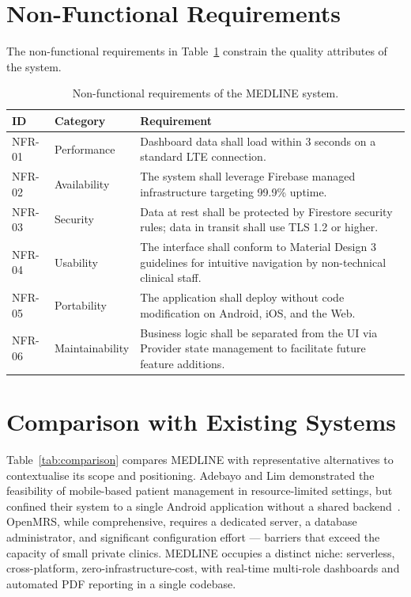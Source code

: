 \documentclass[12pt,a4paper,oneside]{report}
\newcommand{\source}[1]{\par\vspace{2pt}{\small\itshape Source: #1}\par}
\begin{document}
\section{Non-Functional Requirements}

The non-functional requirements in Table~\ref{tab:nfr} constrain the quality
attributes of the system.

\begin{table}[htbp]
  \centering
  \caption{Non-functional requirements of the MEDLINE system.}
  \label{tab:nfr}
  \begin{tabularx}{\textwidth}{l l X}
    \toprule
    \textbf{ID} & \textbf{Category} & \textbf{Requirement}\\
    \midrule
    NFR-01 & Performance & Dashboard data shall load within 3 seconds on a
             standard LTE connection.\\
    NFR-02 & Availability & The system shall leverage Firebase managed
             infrastructure targeting 99.9\% uptime.\\
    NFR-03 & Security & Data at rest shall be protected by Firestore security
             rules; data in transit shall use TLS 1.2 or higher.\\
    NFR-04 & Usability & The interface shall conform to Material Design 3
             guidelines for intuitive navigation by non-technical clinical
             staff.\\
    NFR-05 & Portability & The application shall deploy without code
             modification on Android, iOS, and the Web.\\
    NFR-06 & Maintainability & Business logic shall be separated from the UI via
             Provider state management to facilitate future feature additions.\\
    \bottomrule
  \end{tabularx}
  \source{author.}
\end{table}

\section{Comparison with Existing Systems}

Table~\ref{tab:comparison} compares MEDLINE with representative alternatives to
contextualise its scope and positioning. Adebayo and Lim demonstrated the
feasibility of mobile-based patient management in resource-limited settings,
but confined their system to a single Android application without a shared
backend~\cite{adebayo2021}. OpenMRS, while comprehensive, requires a dedicated
server, a database administrator, and significant configuration effort ---
barriers that exceed the capacity of small private clinics. MEDLINE occupies a
distinct niche: serverless, cross-platform, zero-infrastructure-cost, with
real-time multi-role dashboards and automated PDF reporting in a single
codebase.
\end{document}
